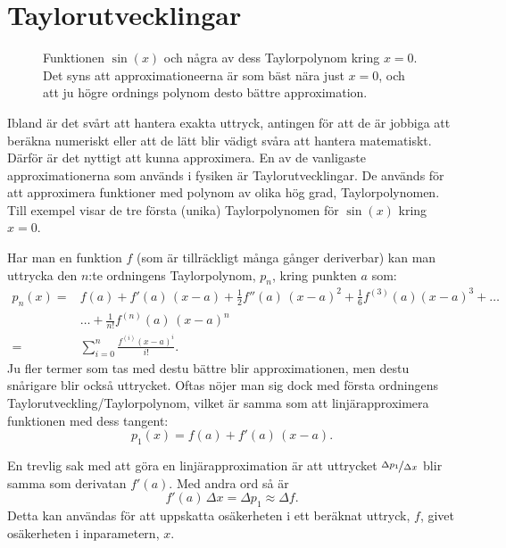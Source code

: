 \documentclass[11pt,a4paper, swedish
]{article}
\newcounter{exempel_counter}%
\begin{document}
\section{Taylorutvecklingar}\label{sec:Taylor}
\begin{figure}
\centering

\caption{Funktionen $\sin(x)$ och några av dess Taylorpolynom kring
  $x=0$. Det syns att approximationeerna är som bäst nära just $x=0$,
  och att ju högre ordnings polynom desto bättre approximation.  }
\label{fig:taylor_sin}
\end{figure}

Ibland är det svårt att hantera exakta uttryck, antingen för att de är
jobbiga att beräkna numeriskt eller att de lätt blir vädigt svåra att
hantera matematiskt. Därför är det nyttigt att kunna approximera. En
av de vanligaste approximationerna som används i fysiken är
Taylorutvecklingar\footnotemark{}. De används för att approximera
funktioner med polynom av olika hög grad, Taylorpolynomen. Till
exempel visar  de tre första (unika)
Taylorpolynomen för $\sin(x)$ kring $x=0$.

Har man en funktion $f$ (som är tillräckligt många gånger deriverbar)
kan man uttrycka den $n$:te ordningens Taylorpolynom, $p_n$, kring punkten
$a$ som:
\begin{equation}\label{eq:taylorpolynom}
\begin{aligned}
p_n(x) =& f(a) + f'(a)\,(x-a) + \frac{1}{2} f''(a)\,(x-a)^2 
 + \frac{1}{6} f^{(3)}(a)(x-a)^3 + \ldots\\
 & \ldots + \frac{1}{n!}f^{(n)}(a)\,(x-a)^n\\
=& \sum_{i=0}^{n} \frac{f^{(i)}(x-a)^i}{i!}.
\end{aligned}
\end{equation}
Ju fler termer som tas med destu bättre blir approximationen, men
destu snårigare blir också uttrycket. 
Oftas nöjer man sig dock med första ordningens
Taylorutveckling/Taylorpolynom, vilket är samma som att
linjärapproximera funktionen med dess tangent:
\begin{equation}\label{eq:linjarappoximation}
p_1(x) = f(a) + f'(a)\,(x-a).
\end{equation}

En trevlig sak med att göra en linjärapproximation är att uttrycket
$\nicefrac{\Delta{p_1}}{\Delta{x}}$ blir samma som derivatan
$f'(a)$. Med andra ord så är 
\begin{equation}\label{eq:Delta_p}
f'(a)\,\Delta{x} = \Delta{p_1} \approx \Delta{f}.
\end{equation}
Detta kan användas för att uppskatta osäkerheten i ett beräknat uttryck,
$f$, givet osäkerheten i inparametern, $x$.
\end{document}
